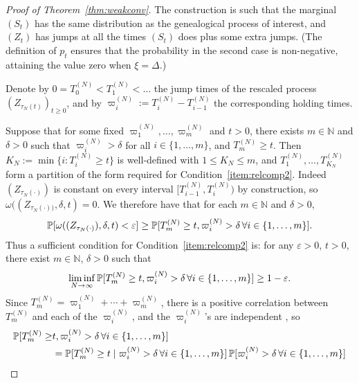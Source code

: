 \begin{proof}[Proof of Theorem~\ref{thm:weakconv}]
The construction is such that the marginal $(S_t)$ has the same distribution as the genealogical process of interest, and $(Z_t)$ has jumps at all the times $(S_t)$ does plus some extra jumps. (The definition of $p_t$ ensures that the probability in the second case is non-negative, attaining the value zero when $\xi=\Delta$.)

Denote by $0=T_0^{(N)}<T_1^{(N)}<\dots$ the jump times of the rescaled process $(Z_{\tau_N(t)})_{t\geq0}$, and by $\varpi_i^{(N)} := T_i^{(N)} - T_{i-1}^{(N)}$ the corresponding holding times.

Suppose that for some fixed $\varpi_1^{(N)}, \dots, \varpi_m^{(N)}$ and $t>0$, there exists $m \in \mathbb{N}$ and $\delta >0$ such that
$\varpi_i^{(N)} > \delta$ for all $i\in \{1,\dots,m\}$, and
$T_m^{(N)} \geq t$.
Then
$K_N := \min\{i : T_i^{(N)} \geq t\}$
is well-defined with $1\leq K_N \leq m$,
and $T_1^{(N)} , \dots, T_{K_N}^{(N)}$ form a partition of the form required for Condition~\ref{item:relcomp2}.
Indeed $(Z_{\tau_N(\cdot)})$ is constant on every interval $[ T_{i-1}^{(N)} , T_i^{(N)} )$ by construction, so $\omega( (Z_{\tau_N(\cdot))} , \delta, t ) = 0$. 
We therefore have that
for each $m \in \mathbb{N}$ and $\delta >0$,
\begin{equation*}
\mathbb{P}[ \omega( (Z_{\tau_N(\cdot)}) , \delta, t ) < \varepsilon ]
\geq \mathbb{P}[ T_m^{(N)} \geq t, \varpi_i^{(N)} > \delta \,\forall i\in \{1,\dots,m\} ] .
\end{equation*}
Thus a sufficient condition for Condition~\ref{item:relcomp2} is: 
for any $\varepsilon>0$, $t>0$, there exist $m\in\mathbb{N}$, $\delta>0$ such that
\begin{equation}\label{eq:condition2b}
\liminf_{N\to\infty} 
        \mathbb{P}[ T_m^{(N)} \geq t, \varpi_i^{(N)} > \delta \,\forall i\in \{1,\dots,m\} ]
\geq 1-\varepsilon .
\end{equation}
Since $T_m^{(N)} = \varpi_1^{(N)} + \cdots + \varpi_m^{(N)}$, there is a positive correlation between $T_m^{(N)}$ and each of the $\varpi_i^{(N)}$, and the $\varpi_i^{(N)}$'s are independent
, so
\begin{align*}
\Prob[ T_m^{(N)} \geq &t, \varpi_i^{(N)} > \delta \,\forall i\in \{1,\dots,m\} ] 
        \\
&= \Prob[ T_m^{(N)} \geq t \mid \varpi_i^{(N)} > \delta \,\forall i\in \{1,\dots,m\} ]
        \,\Prob[ \varpi_i^{(N)} > \delta \,\forall i\in \{1,\dots,m\} ] \\

\end{align*}
\end{proof}
